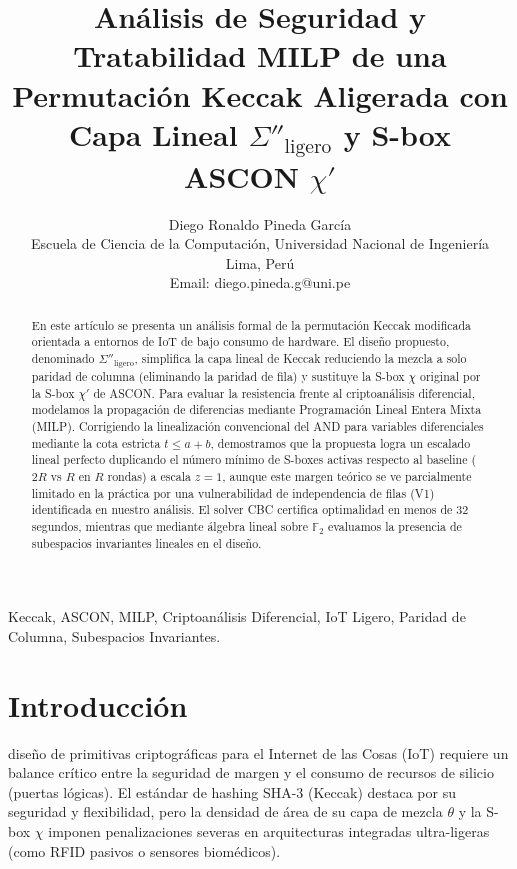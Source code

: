 \documentclass[journal,compsoc]{IEEEtran}
\begin{document}
\title{Análisis de Seguridad y Tratabilidad MILP de una Permutación Keccak Aligerada con Capa Lineal \texorpdfstring{$\Sigma''_{\text{ligero}}$}{Sigma''\_ligero} y S-box ASCON \texorpdfstring{$\chi'$}{chi'}}

\author{Diego Ronaldo Pineda Garc\'{i}a\\
\small Escuela de Ciencia de la Computación, Universidad Nacional de Ingeniería\\
\small Lima, Perú\\
\small Email: diego.pineda.g@uni.pe}

\maketitle

\begin{abstract}
En este artículo se presenta un análisis formal de la permutación Keccak modificada orientada a entornos de IoT de bajo consumo de hardware. El diseño propuesto, denominado $\Sigma''_{\text{ligero}}$, simplifica la capa lineal de Keccak reduciendo la mezcla a solo paridad de columna (eliminando la paridad de fila) y sustituye la S-box $\chi$ original por la S-box $\chi'$ de ASCON. Para evaluar la resistencia frente al criptoanálisis diferencial, modelamos la propagación de diferencias mediante Programación Lineal Entera Mixta (MILP). Corrigiendo la linealización convencional del AND para variables diferenciales mediante la cota estricta $t \le a + b$, demostramos que la propuesta logra un escalado lineal perfecto duplicando el número mínimo de S-boxes activas respecto al baseline ($2R$ vs $R$ en $R$ rondas) a escala $z=1$, aunque este margen teórico se ve parcialmente limitado en la práctica por una vulnerabilidad de independencia de filas (V1) identificada en nuestro análisis. El solver CBC certifica optimalidad en menos de 32 segundos, mientras que mediante álgebra lineal sobre $\mathbb{F}_2$ evaluamos la presencia de subespacios invariantes lineales en el diseño.
\end{abstract}

\begin{IEEEkeywords}
Keccak, ASCON, MILP, Criptoanálisis Diferencial, IoT Ligero, Paridad de Columna, Subespacios Invariantes.
\end{IEEEkeywords}

\section{Introducción}
 diseño de primitivas criptográficas para el Internet de las Cosas (IoT) requiere un balance crítico entre la seguridad de margen y el consumo de recursos de silicio (puertas lógicas). El estándar de hashing SHA-3 (Keccak) destaca por su seguridad y flexibilidad, pero la densidad de área de su capa de mezcla $\theta$ y la S-box $\chi$ imponen penalizaciones severas en arquitecturas integradas ultra-ligeras (como RFID pasivos o sensores biomédicos).
\end{document}
